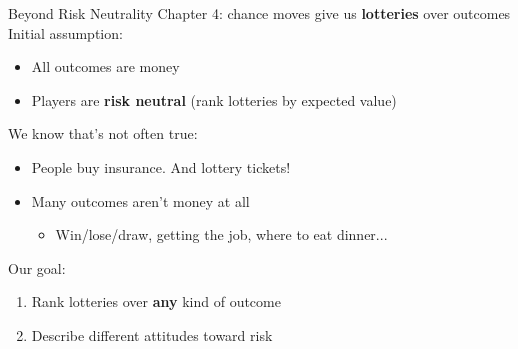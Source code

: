 \begin{frame}{Beyond Risk Neutrality}
Chapter 4: chance moves give us \textbf{lotteries} over outcomes\\
Initial assumption:
\begin{itemize}
    \item All outcomes are money
    \item Players are \textbf{risk neutral} (rank lotteries by expected value)
\end{itemize}
\bsk
We know that's not often true:
\begin{itemize}
    \item People buy insurance. And lottery tickets!
    \item Many outcomes aren't money at all
    \begin{itemize}
        \item Win/lose/draw, getting the job, where to eat dinner...
    \end{itemize}
\end{itemize}
\vfill
Our goal:
\begin{enumerate}
    \item Rank lotteries over \textbf{any} kind of outcome
    \item Describe different attitudes toward risk
\end{enumerate}
\vspace{-0.4in}
\end{frame}


